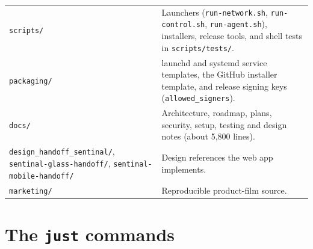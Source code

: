 \begin{small}
\begin{longtable}{>{\raggedright\arraybackslash}p{0.479\dimexpr \linewidth-4\tabcolsep\relax}>{\raggedright\arraybackslash}p{0.521\dimexpr \linewidth-4\tabcolsep\relax}}
\texttt{scripts/\allowbreak{}} & Launchers (\texttt{run-{}\allowbreak{}network.\allowbreak{}sh}, \texttt{run-{}\allowbreak{}control.\allowbreak{}sh}, \texttt{run-{}\allowbreak{}agent.\allowbreak{}sh}), installers, release tools, and shell tests in \texttt{scripts/\allowbreak{}tests/\allowbreak{}}. \\
\texttt{packaging/\allowbreak{}} & launchd and systemd service templates, the GitHub installer template, and release signing keys (\texttt{allowed\_\allowbreak{}signers}). \\
\texttt{docs/\allowbreak{}} & Architecture, roadmap, plans, security, setup, testing and design notes (about 5,800 lines). \\
\texttt{design\_\allowbreak{}handoff\_\allowbreak{}sentinal/\allowbreak{}}, \texttt{sentinal-{}\allowbreak{}glass-{}\allowbreak{}handoff/\allowbreak{}}, \texttt{sentinal-{}\allowbreak{}mobile-{}\allowbreak{}handoff/\allowbreak{}} & Design references the web app implements. \\
\texttt{marketing/\allowbreak{}} & Reproducible product-film source. \\
\bottomrule
\end{longtable}
\end{small}

\section{\texorpdfstring{The \texttt{just} commands}{The just commands}}

